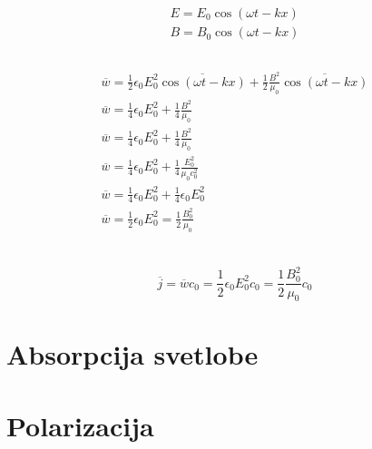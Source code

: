 \documentclass[a4paper,12pt]{article}
\begin{document}
\begin{align}
    E = E_0 \cos(\omega t - kx) \\
    B = B_0 \cos(\omega t - kx)
\end{align}

\subsection{}
\begin{align}
    \overline{w} = \frac{1}{2} \epsilon_0 E_0^2 \overline{\cos(\omega t - kx)} + \frac{1}{2} \frac{B^2}{\mu_0} \overline{\cos(\omega t - kx)} \\
    \overline{w} = \frac{1}{4} \epsilon_0 E_0^2 + \frac{1}{4} \frac{B^2}{\mu_0} \\
    \overline{w} = \frac{1}{4} \epsilon_0 E_0^2 + \frac{1}{4} \frac{B^2}{\mu_0} \\
    \overline{w} = \frac{1}{4} \epsilon_0 E_0^2 + \frac{1}{4} \frac{E_0^2}{\mu_0 c_0^2} \\
    \overline{w} = \frac{1}{4} \epsilon_0 E_0^2 + \frac{1}{4} \epsilon_0 E_0^2 \\
    \overline{w} = \frac{1}{2} \epsilon_0 E_0^2 = \frac{1}{2} \frac{B_0^2}{\mu_0} \\
\end{align}

\subsection{}
\begin{equation}
    \overline{j} = \overline{w} c_0 = \frac{1}{2} \epsilon_0 E_0^2 c_0 = \frac{1}{2} \frac{B_0^2}{\mu_0} c_0
\end{equation}

\newpage
\section{Absorpcija svetlobe}

\newpage
\section{Polarizacija}

\newpage
\end{document}

